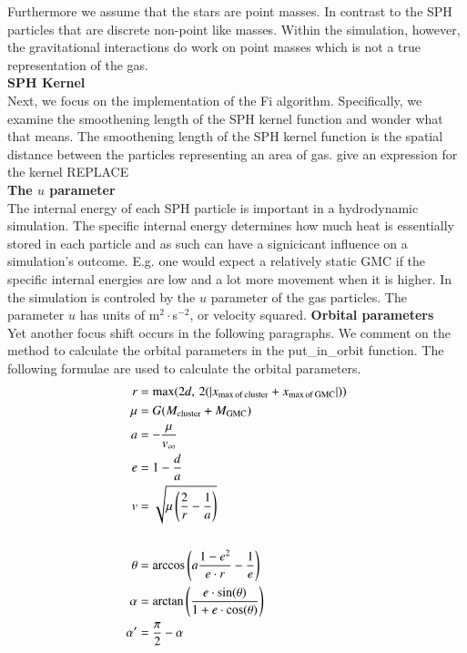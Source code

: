 \documentclass{aa}
\begin{document}
Furthermore we assume that the stars are point masses. In contrast to the SPH particles that are discrete non-point like masses. Within the simulation, however, the gravitational interactions do work on point masses which is not a true representation of the gas. \\

\noindent \textbf{SPH Kernel} \\
Next, we focus on the implementation of the Fi algorithm. Specifically, we examine the smoothening length of the SPH kernel function and wonder what that means. The smoothening length of the SPH kernel function is the spatial distance between the particles representing an area of gas. \cite{1985A&A...149..135M} give an expression for the kernel REPLACE \\
\noindent \textbf{The $u$ parameter} \\
The internal energy of each SPH particle is important in a hydrodynamic simulation. The specific internal energy determines how much heat is essentially stored in each particle and as such can have a signicicant influence on a simulation's outcome. E.g. one would expect a relatively static GMC if the specific internal energies are low and a lot more movement when it is higher. In the simulation is controled by the $u$ parameter of the gas particles. The parameter $u$ has units of m$^2\cdot$s$^{-2}$, or velocity squared.
\noindent \textbf{Orbital parameters} \\
Yet another focus shift occurs in the following paragraphs. We comment on the method to calculate the orbital parameters in the put\_in\_orbit function. The following formulae are used to calculate the orbital parameters.
\begin{align}
    r &= \text{max}(2d, \, 2 (\left| x_{\rm max \, of \, cluster} + x_{\rm max \, of \, GMC}\right|)) \\
    \mu &= G (M_{\rm cluster} + M_{\rm GMC}) \\
    a &= -\frac{\mu}{v_\infty} \label{eq:a} \\
    e &= 1 - \frac{d}{a} \label{eq:e} \\
    v &= \sqrt{\mu \left(\frac{2}{r} - \frac{1}{a}\right)} \\
    \newline \nonumber \\
    \theta &= \arccos \left(a \frac{1-e^2}{e\cdot r} - \frac{1}{e} \right) \\
    \alpha &=  \arctan \left(\frac{e\cdot \sin(\theta)}{1 + e\cdot \cos(\theta)}\right) \\
    \alpha' &= \frac{\pi}{2} - \alpha
\end{align}
\end{document}
